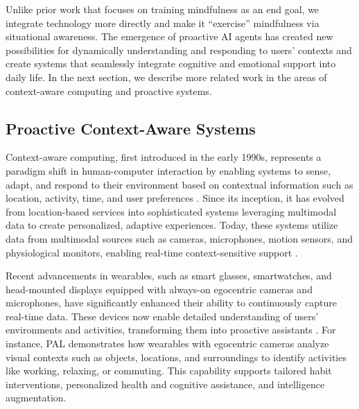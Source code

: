 Unlike prior work that focuses on training mindfulness as an end goal, we integrate technology more directly and make it ``exercise'' mindfulness via situational awareness. The emergence of proactive AI agents has created new possibilities for dynamically understanding and responding to users’ contexts and create systems that seamlessly integrate cognitive and emotional support into daily life. In the next section, we describe more related work in the areas of context-aware computing and proactive systems.





\subsection{Proactive Context-Aware Systems}
Context-aware computing, first introduced in the early 1990s, represents a paradigm shift in human-computer interaction by enabling systems to sense, adapt, and respond to their environment based on contextual information such as location, activity, time, and user preferences \cite{Schilit1994, Dey2001}. Since its inception, it has evolved from location-based services into sophisticated systems leveraging multimodal data to create personalized, adaptive experiences. Today, these systems utilize data from multimodal sources such as cameras, microphones, motion sensors, and physiological monitors, enabling real-time context-sensitive support \cite{Gellersen2002, 10.1145/344949.344988}.

Recent advancements in wearables, such as smart glasses, smartwatches, and head-mounted displays equipped with always-on egocentric cameras and microphones, have significantly enhanced their ability to continuously capture real-time data. These devices now enable detailed understanding of users' environments and activities, transforming them into proactive assistants \cite{10.1145/3699759, 10.1016/j.ins.2012.12.028, Wahl2015WISEglassMC, lee2024gazepointarcontextawaremultimodalvoice}. For instance, PAL \cite{Khan2019PALAW, Khan2021, khan2021palintelligenceaugmentationusing} demonstrates how wearables with egocentric cameras analyze visual contexts such as objects, locations, and surroundings to identify activities like working, relaxing, or commuting. This capability supports tailored habit interventions, personalized health and cognitive assistance, and intelligence augmentation.

